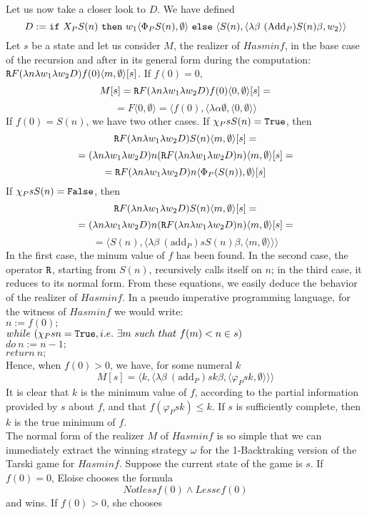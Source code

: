 \documentclass[copyright,creativecommons]{eptcs}
\newcommand{\True}                     { {\tt{True}} }
\newcommand{\False}                    { {\tt{False}} }
\newcommand{\Add}                      { {\mbox{Add}} }
\newcommand{\add}                      { {\mbox{add}} }
\begin{document}
 Let us now take a closer look to $D$. We have defined \[D:={\tt if}\
X_P S(n)\  {\tt then}\  w_1\langle \Phi_P S(n), \emptyset
\rangle \
{\tt else}\ \langle S(n),\langle \lambda \beta\ (\Add_P) 
S(n)\beta,w_2\rangle \rangle
\]
 Let $s$ be a state and let us consider $M$, the realizer of $Hasminf$, in the base case of the recursion and after in its general form during the computation: ${\tt R}F(\lambda n\lambda
w_1\lambda w_2 D)f(0)\langle m,\emptyset\rangle
[s]$. If $f(0)=0$, \[M[s]={\tt R}F(\lambda n\lambda w_1\lambda
w_2 D)f(0)\langle{0},\emptyset\rangle
[s]=\] \[=F\langle 0,\emptyset\rangle
=\langle f(0),\langle \lambda
\alpha \emptyset, \langle 0,\emptyset\rangle \rangle  \]
If $f(0)=S(n)$, we have two other cases. If $\chi_PsS({n})=\True$, then \[{\tt R}F(\lambda n\lambda w_1\lambda
w_2 D)S({n})\langle{m},\emptyset\rangle
[s]=\]\[=(\lambda n\lambda w_1\lambda w_2 D){n}({\tt R}F(\lambda
n\lambda w_1\lambda w_2 D){n})\langle
{m},\emptyset\rangle [s]= \]\[={\tt R}F(\lambda n\lambda
w_1\lambda w_2 D){n}\langle \Phi_P
(S({n})),\emptyset\rangle [s]\]
If $\chi_PsS({n})=\False$, then \[{\tt R}F(\lambda n\lambda
w_1\lambda w_2 D)S({n})\langle {m},\emptyset\rangle
[s]=\]\[=(\lambda n\lambda w_1\lambda w_2 D){n}({\tt R}F(\lambda
n\lambda w_1\lambda w_2
D){n})\langle {m},\emptyset\rangle [s]= \]\[=
\langle S({n}),\langle \lambda \beta\ (\add_P)s S(n)\beta,\langle {m},\emptyset\rangle \rangle
\rangle \]
In the first case, the minum value of $f$ has been found. In the second case, the operator ${\tt R}$, starting from $S(n)$, recursively calls itself on $n$; in the third case, it reduces to its normal form. From these equations, we easily deduce the behavior of
the realizer of $Hasminf$.   In a pseudo imperative programming
language, for the witness of $Hasminf$ we would write:\\
$n:=f(0);$\\
$while\ (\chi_Psn=\True, i.e.\ \exists m \ such\ that\  f({m})<
n\in
s)$\\
$do\ n:=n-1;$\\
$return\ n;$ \\
Hence, when $f(0)>0$, we have, for some numeral $k$ 
\[M[s]=\langle k,\langle \lambda \beta\ (\add_P)s k\beta,\langle
\varphi_Psk,\emptyset\rangle \rangle \rangle \]
It is clear that $k$  is the
minimum value of $f$, according to the partial information provided by
$s$
about $f$, and that $f(\varphi_Psk)\leq k$. If $s$ is sufficiently complete, then $k$
is the true minimum of $f$.\\
The normal form of the realizer $M$ of $Hasminf$ is so simple that we can immediately extract the winning strategy $\omega$ for the 1-Backtraking version of the Tarski game for $Hasminf$.
Suppose the current state of the game is $s$. If $f(0)=0$, Eloise chooses the formula
\[Notlessf(0)\land Lessef (0)\]
and wins. If $f(0)>0$, she chooses 
\end{document}
